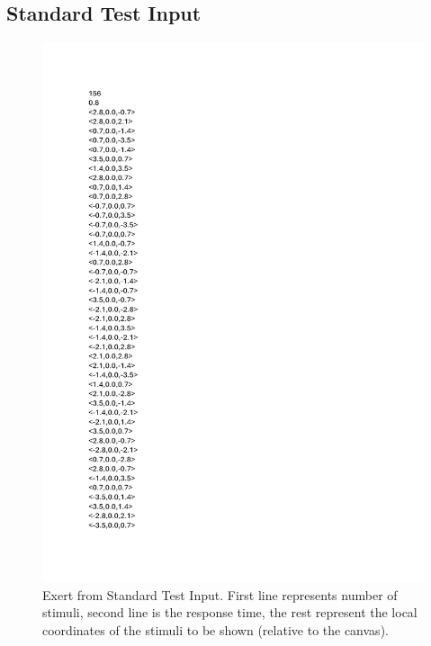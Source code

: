 \documentclass{l4proj}
\begin{document}
\begin{appendices}
\subsection{Standard Test Input} \label{appendix:standard_test}
\begin{figure}[htbp]
    \centering
    \includegraphics[page=1,width=0.8\linewidth]{dissertation/images/Standard_Test.pdf}   
    \caption{Exert from Standard Test Input. First line represents number of stimuli, second line is the response time,  the rest represent the local coordinates of the stimuli to be shown (relative to the canvas).}
\end{figure}

\end{appendices}
\end{document}
